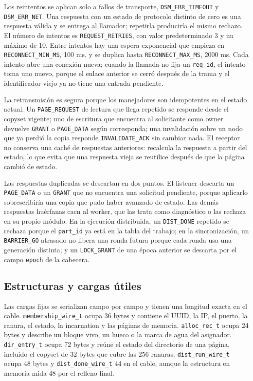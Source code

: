 Los reintentos se aplican solo a fallos de transporte, \texttt{DSM\_ERR\_TIMEOUT} y \texttt{DSM\_ERR\_NET}. Una respuesta con un estado de protocolo distinto de cero es una respuesta válida y se entrega al llamador; repetirla produciría el mismo rechazo. El número de intentos es \texttt{REQUEST\_RETRIES}, con valor predeterminado 3 y un máximo de 10. Entre intentos hay una espera exponencial que empieza en \texttt{RECONNECT\_MIN\_MS}, 100 ms, y se duplica hasta \texttt{RECONNECT\_MAX\_MS}, 2000 ms. Cada intento abre una conexión nueva; cuando la llamada no fija un \texttt{req\_id}, el intento toma uno nuevo, porque el enlace anterior se cerró después de la trama y el identificador viejo ya no tiene una entrada pendiente.

La retransmisión es segura porque los manejadores son idempotentes en el estado actual. Un \texttt{PAGE\_REQUEST} de lectura que llega repetido se responde desde el copyset vigente; uno de escritura que encuentra al solicitante como owner devuelve \texttt{GRANT} o \texttt{PAGE\_DATA} según corresponda; una invalidación sobre un nodo que ya perdió la copia responde \texttt{INVALIDATE\_ACK} sin cambiar nada. El receptor no conserva una caché de respuestas anteriores: recalcula la respuesta a partir del estado, lo que evita que una respuesta vieja se reutilice después de que la página cambió de estado.

Las respuestas duplicadas se descartan en dos puntos. El listener descarta un \texttt{PAGE\_DATA} o un \texttt{GRANT} que no encuentra una solicitud pendiente, porque aplicarlo sobrescribiría una copia que pudo haber avanzado de estado. Las demás respuestas huérfanas caen al worker, que las trata como diagnóstico o las rechaza en su propio módulo. En la ejecución distribuida, un \texttt{DIST\_DONE} repetido se rechaza porque el \texttt{part\_id} ya está en la tabla del trabajo; en la sincronización, un \texttt{BARRIER\_GO} atrasado no libera una ronda futura porque cada ronda usa una generación distinta; y un \texttt{LOCK\_GRANT} de una época anterior se descarta por el campo \texttt{epoch} de la cabecera.

\subsection{Estructuras y cargas útiles}

Las cargas fijas se serializan campo por campo y tienen una longitud exacta en el cable. \texttt{membership\_wire\_t} ocupa 36 bytes y contiene el UUID, la IP, el puerto, la ranura, el estado, la incarnation y las páginas de memoria. \texttt{alloc\_rec\_t} ocupa 24 bytes y describe un bloque vivo, un hueco o la marca de agua del asignador. \texttt{dir\_entry\_t} ocupa 72 bytes y reúne el estado del directorio de una página, incluido el copyset de 32 bytes que cubre las 256 ranuras. \texttt{dist\_run\_wire\_t} ocupa 48 bytes y \texttt{dist\_done\_wire\_t} 44 en el cable, aunque la estructura en memoria mida 48 por el relleno final.

